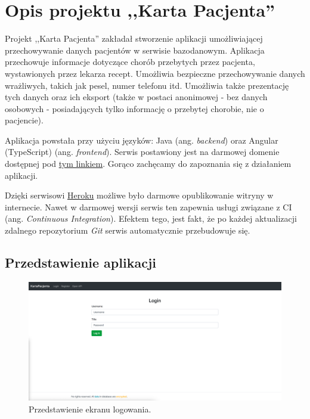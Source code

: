 \section{Opis projektu ,,Karta Pacjenta''}
Projekt ,,Karta Pacjenta'' zakładał stworzenie aplikacji umożliwiającej przechowywanie danych pacjentów w serwisie bazodanowym. Aplikacja przechowuje informacje dotyczące chorób przebytych przez pacjenta, wystawionych przez lekarza recept. Umożliwia bezpieczne przechowywanie danych wrażliwych, takich jak pesel, numer telefonu itd. Umożliwia także prezentację tych danych oraz ich eksport (także w postaci anonimowej - bez danych osobowych - posiadających tylko informację o przebytej chorobie, nie o pacjencie). 

Aplikacja powstała przy użyciu języków: Java (ang. \textit{backend}) oraz Angular (TypeScript) (ang. \textit{frontend}). Serwis postawiony jest na darmowej domenie dostępnej pod \href{http://trunk-kartapacjenta.herokuapp.com/}{tym linkiem}. Gorąco zachęcamy do zapoznania się z działaniem aplikacji. 

Dzięki serwisowi \href{https://heroku.com/} {Heroku} możliwe było darmowe opublikowanie witryny w internecie. Nawet w darmowej wersji serwis ten zapewnia usługi związane z CI (ang. \textit{Continuous Integration}). Efektem tego, jest fakt, że po każdej aktualizacji zdalnego repozytorium \textit{Git} serwis automatycznie przebudowuje się.

\subsection{Przedstawienie aplikacji}

\begin{figure}[H]
\centering
\includegraphics[width=15cm]{pictures/service/01_login}
\caption{Przedstawienie ekranu logowania.}
\end{figure}

